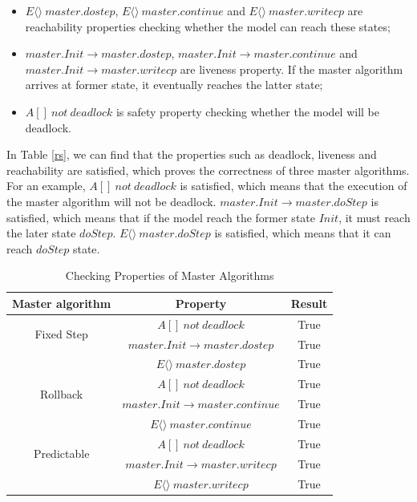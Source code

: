 \begin{itemize}
\item
$E\langle\rangle~master.dostep$, $E\langle\rangle~master.continue$ and $E\langle\rangle~master.writecp$ are reachability properties checking whether the model can reach these states;
\item
$master.Init \rightarrow master.dostep$, $master.Init \rightarrow master.continue$ and $master.Init \rightarrow master.writecp$ are liveness property. If the master algorithm arrives at former state, it eventually reaches the latter state;
\item
$A[]~not~deadlock$ is safety property checking whether the model will be deadlock.
\end{itemize}

In Table \ref{rs}, we can find that the properties such as deadlock, liveness and reachability are satisfied,  which proves the correctness of three master algorithms. For an example, $A[]~not~deadlock$ is satisfied, which means that the execution of the master algorithm will not be deadlock. $master.Init \rightarrow master.doStep$ is satisfied, which means that if the model reach the former state $Init$, it must reach the later state $doStep$. $E\langle\rangle~master.doStep$ is satisfied, which means that it can reach $doStep$ state. 

\begin{table}
\caption{Checking Properties of Master Algorithms}
\centering
\begin{tabular}{c c c}
        \hline
        Master algorithm & Property & Result\\
        \hline
        \multirow{2}{2.0cm}{Fixed Step}
                & $A[]~not~deadlock$ & True\\
                & $master.Init \rightarrow master.dostep$ & True\\
                & $E\langle\rangle~master.dostep$ & True\\

        \hline
        \multirow{2}{2.0cm}{Rollback}
                & $A[]~not~deadlock$ & True\\
                & $master.Init \rightarrow master.continue$ & True\\
                & $E\langle\rangle~master.continue$ & True\\

        \hline
        \multirow{2}{2.0cm}{Predictable}
                & $A[]~not~deadlock$ & True\\
                & $master.Init \rightarrow  master.writecp$ & True\\
                & $E\langle\rangle~master.writecp$ & True\\
        \hline
\end{tabular}
\label{ta_rs}
\end{table}